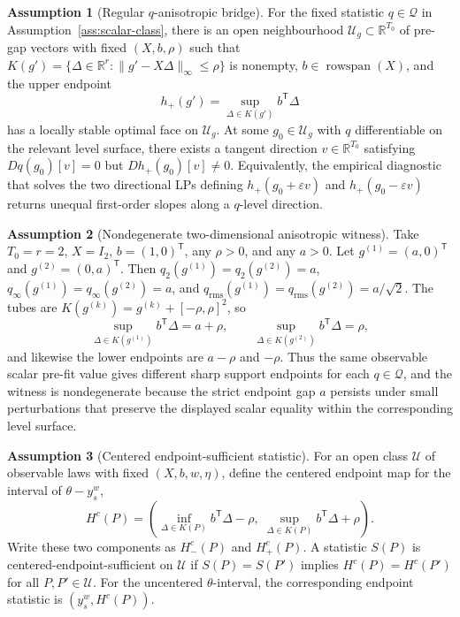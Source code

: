 \documentclass[11pt]{article}
\newcommand{\transpose}{\mathsf{T}}
\newcommand{\R}{\mathbb{R}}
\theoremstyle{definition}
\newtheorem{assumption}{Assumption}
\theoremstyle{plain}
\theoremstyle{remark}
\begin{document}
\begin{assumption}[Regular \(q\)-anisotropic bridge]\label{ass:anisotropic}
For the fixed statistic \(q\in\mathcal Q\) in Assumption~\ref{ass:scalar-class}, there is an open neighbourhood \(\mathcal U_g\subset\R^{T_0}\) of pre-gap vectors with fixed \((X,b,\rho)\) such that \(K(g')=\{\Delta\in\R^r:\|g'-X\Delta\|_\infty\le\rho\}\) is nonempty, \(b\in\operatorname{rowspan}(X)\), and the upper endpoint
\[
h_+(g')=\sup_{\Delta\in K(g')}b^\transpose\Delta
\]
has a locally stable optimal face on \(\mathcal U_g\). At some \(g_0\in\mathcal U_g\) with \(q\) differentiable on the relevant level surface, there exists a tangent direction \(v\in\R^{T_0}\) satisfying \(Dq(g_0)[v]=0\) but \(Dh_+(g_0)[v]\ne0\). Equivalently, the empirical diagnostic that solves the two directional LPs defining \(h_+(g_0+\varepsilon v)\) and \(h_+(g_0-\varepsilon v)\) returns unequal first-order slopes along a \(q\)-level direction.
\end{assumption}

\begin{assumption}[Nondegenerate two-dimensional anisotropic witness]\label{ass:two-dimensional-witness}
Take \(T_0=r=2\), \(X=I_2\), \(b=(1,0)^\transpose\), any \(\rho>0\), and any \(a>0\). Let \(g^{(1)}=(a,0)^\transpose\) and \(g^{(2)}=(0,a)^\transpose\). Then \(q_2(g^{(1)})=q_2(g^{(2)})=a\), \(q_\infty(g^{(1)})=q_\infty(g^{(2)})=a\), and \(q_{\mathrm{rms}}(g^{(1)})=q_{\mathrm{rms}}(g^{(2)})=a/\sqrt2\). The tubes are \(K(g^{(k)})=g^{(k)}+[-\rho,\rho]^2\), so
\[
\sup_{\Delta\in K(g^{(1)})}b^\transpose\Delta=a+\rho,\qquad
\sup_{\Delta\in K(g^{(2)})}b^\transpose\Delta=\rho,
\]
and likewise the lower endpoints are \(a-\rho\) and \(-\rho\). Thus the same observable scalar pre-fit value gives different sharp support endpoints for each \(q\in\mathcal Q\), and the witness is nondegenerate because the strict endpoint gap \(a\) persists under small perturbations that preserve the displayed scalar equality within the corresponding level surface.
\end{assumption}

\begin{assumption}[Centered endpoint-sufficient statistic]\label{ass:endpoint-sufficient}
For an open class \(\mathcal U\) of observable laws with fixed \((X,b,w,\eta)\), define the centered endpoint map for the interval of \(\theta-y_s^w\),
\[
H^c(P)=\left(
\inf_{\Delta\in K(P)}b^\transpose\Delta-\rho,\;
\sup_{\Delta\in K(P)}b^\transpose\Delta+\rho
\right).
\]
Write these two components as \(H^c_-(P)\) and \(H^c_+(P)\). A statistic \(S(P)\) is centered-endpoint-sufficient on \(\mathcal U\) if \(S(P)=S(P')\) implies \(H^c(P)=H^c(P')\) for all \(P,P'\in\mathcal U\). For the uncentered \(\theta\)-interval, the corresponding endpoint statistic is \((y_s^w,H^c(P))\).
\end{assumption}
\end{document}
